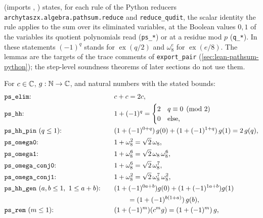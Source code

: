  (imports , ) states, for each rule of the Python reducers
\textnormal{\texttt{archytaszx.\allowbreak{}algebra.\allowbreak{}pathsum.\allowbreak{}reduce}} and \textnormal{\texttt{reduce\_\allowbreak{}qudit}}, the scalar identity the rule applies
to the sum over its eliminated variables, at the Boolean values $0,1$ of the variables its quotient
polynomials read (\textnormal{\texttt{ps\_\allowbreak{}*}}) or at a residue mod $p$ (\textnormal{\texttt{q\_\allowbreak{}*}}). In these statements
$(-1)^q$ stands for $\operatorname{ex}(q/2)$ and $\omega_8^e$ for $\operatorname{ex}(e/8)$. The
lemmas are the targets of the trace comments of \textnormal{\texttt{export\_\allowbreak{}pair}}
(\cref{sec:lean-pathsum-python}); the step-level soundness theorems of later sections do not use
them.

\begin{theorem}\label{thm:lean-pathsum-ps}
For $c\in\mathbb{C}$, $g:\mathbb{N}\to\mathbb{C}$, and natural numbers with the stated bounds:
\begin{alignat*}{2}
&\text{\textnormal{\texttt{ps\_\allowbreak{}elim}}:}\quad && c+c = 2c,\\
&\text{\textnormal{\texttt{ps\_\allowbreak{}hh}}:}\quad && 1+(-1)^q = \begin{cases}2 & q\equiv 0 \pmod 2\\ 0 & \text{else,}\end{cases}\\
&\text{\textnormal{\texttt{ps\_\allowbreak{}hh\_\allowbreak{}pin}} }(q\le 1)\text{:}\quad && (1+(-1)^{0+q})\,g(0)+(1+(-1)^{1+q})\,g(1) = 2\,g(q),\\
&\text{\textnormal{\texttt{ps\_\allowbreak{}omega0}}:}\quad && 1+\omega_8^2 = \sqrt2\,\omega_8,\\
&\text{\textnormal{\texttt{ps\_\allowbreak{}omega1}}:}\quad && 1+\omega_8^6 = \sqrt2\,\omega_8\,\omega_8^6,\\
&\text{\textnormal{\texttt{ps\_\allowbreak{}omega\_\allowbreak{}conj0}}:}\quad && 1+\omega_8^6 = \sqrt2\,\omega_8^7,\\
&\text{\textnormal{\texttt{ps\_\allowbreak{}omega\_\allowbreak{}conj1}}:}\quad && 1+\omega_8^2 = \sqrt2\,\omega_8^7\,\omega_8^2,\\
&\text{\textnormal{\texttt{ps\_\allowbreak{}hh\_\allowbreak{}gen}} }(a,b\le1,\ 1\le a+b)\text{:}\quad &&
  (1+(-1)^{0a+b})g(0)+(1+(-1)^{1a+b})g(1)\\
 &&& \qquad = (1+(-1)^{b(1+a)})\,g(b),\\
&\text{\textnormal{\texttt{ps\_\allowbreak{}rem}} }(m\le1)\text{:}\quad && (1+(-1)^m)(c^m g) = (1+(-1)^m)\,g,\\

\end{alignat*}
\end{theorem}
